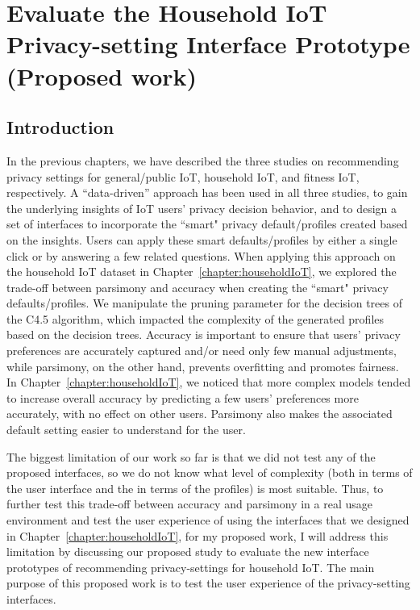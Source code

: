\chapter{Evaluate the Household IoT Privacy-setting Interface Prototype (Proposed work)}\label{chapter:evaluation}

\section{Introduction}

In the previous chapters, we have described the three studies on recommending privacy settings for general/public IoT, household IoT, and fitness IoT, respectively. A ``data-driven” approach has been used in all three studies, to gain the underlying insights of IoT users' privacy decision behavior, and to design a set of interfaces to incorporate the ``smart" privacy default/profiles created based on the insights. Users can apply these smart defaults/profiles by either a single click or by answering a few related questions. When applying this approach on the household IoT dataset in Chapter~\ref{chapter:householdIoT}, we explored the trade-off between parsimony and accuracy when creating the ``smart" privacy defaults/profiles. We manipulate the pruning parameter for the decision trees of the C4.5 algorithm, which impacted the complexity of the generated profiles based on the decision trees. Accuracy is important to ensure that users' privacy preferences are accurately captured and/or need only few manual adjustments, while parsimony, on the other hand, prevents overfitting and promotes fairness. In Chapter~\ref{chapter:householdIoT}, we noticed that more complex models tended to increase overall accuracy by predicting a few users' preferences more accurately, with no effect on other users. Parsimony also makes the associated default setting easier to understand for the user. 

The biggest limitation of our work so far is that we did not test any of the proposed interfaces, so we do not know what level of complexity (both in terms of the user interface and the in terms of the profiles) is most suitable. Thus, to further test this trade-off between accuracy and parsimony in a real usage environment and test the user experience of using the interfaces that we designed in Chapter~\ref{chapter:householdIoT}, for my proposed work, I will address this limitation by discussing our proposed study to evaluate the new interface prototypes of recommending privacy-settings for household IoT. The main purpose of this proposed work is to test the user experience of the privacy-setting interfaces.


